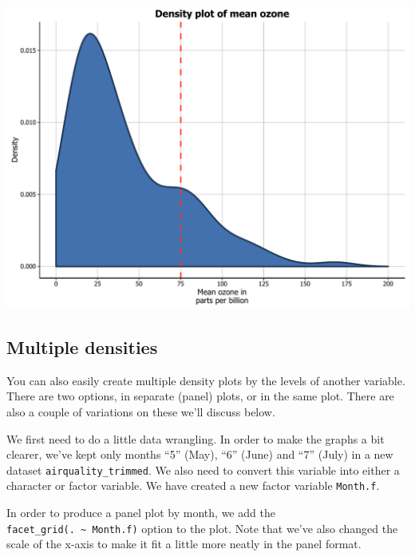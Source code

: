 \documentclass[]{article}
\begin{document}
\begin{center}\includegraphics{0_all_posts_pdf/density_13-1} \end{center}

\subsection{Multiple densities}\label{multiple-densities}

You can also easily create multiple density plots by the levels of
another variable. There are two options, in separate (panel) plots, or
in the same plot. There are also a couple of variations on these we'll
discuss below.

We first need to do a little data wrangling. In order to make the graphs
a bit clearer, we've kept only months ``5'' (May), ``6'' (June) and
``7'' (July) in a new dataset \texttt{airquality\_trimmed}. We also need
to convert this variable into either a character or factor variable. We
have created a new factor variable \texttt{Month.f}.

In order to produce a panel plot by month, we add the
\texttt{facet\_grid(.\ \textasciitilde{}\ Month.f)} option to the plot.
Note that we've also changed the scale of the x-axis to make it fit a
little more neatly in the panel format.
\end{document}
